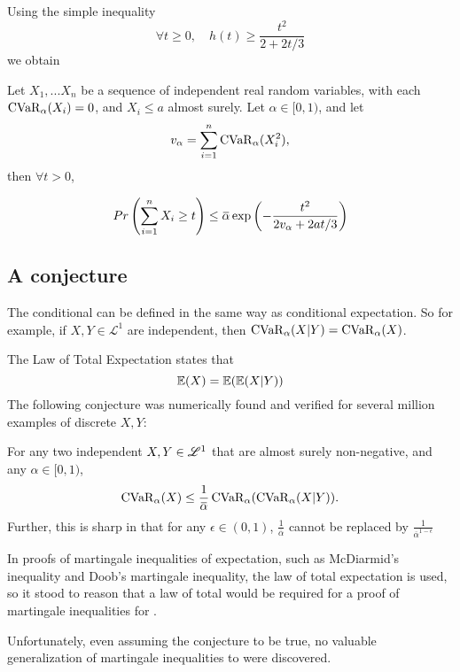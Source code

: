 Using the simple inequality
$$\forall t\ge 0, \quad h(t) \ge \frac{t^2}{2 + 2t/3} $$
we obtain
\begin{cor}
	Let $X_1, ... X_n$ be a sequence of independent real random variables, with each $\operatorname{CVaR}_\alpha(X_i)  = 0$, and $X_i \le a$ almost surely. Let $\alpha \in [0, 1)$, and let 
	$$v_\alpha = \sum_{i = 1}^n\operatorname{CVaR}_\alpha(X_i^2),$$
	then $\forall t > 0$, 
	
	\begin{equation}
	\begin{aligned}
	Pr\left(\sumn X_i \ge t\right) \le {\overbar{\alpha}} \exp\left(-\frac{t^2}{2v_\alpha + 2at/3}\right)
	\end{aligned}
	\end{equation}
\end{cor}

\subsection{A conjecture}
The conditional \cvar can be defined in the same way as conditional expectation. So for example, if $X, Y\in\mathscr{L}^1$ are independent, then $\operatorname{CVaR}_\alpha(X|Y) = \operatorname{CVaR}_\alpha(X)$.

The Law of Total Expectation states that 
\begin{equation}
\mathbb{E}(X) = \mathbb{E}(\mathbb{E}(X|Y))
\end{equation}
The following conjecture was numerically found and verified for several million examples of discrete $X, Y$:
\begin{conj}\label{conj:total_cvar}
	For any two independent $X, Y\in \mathscr{L}^1$ that are almost surely non-negative, and any $\alpha \in [0, 1)$, 
	\begin{equation}
	\Ca(X) \le \frac{1}{\overbar\alpha}\Ca(\Ca(X|Y)).
	\end{equation}
	Further, this is sharp in that for any $\epsilon\in(0, 1)$, $\frac{1}{\overbar\alpha}$ cannot be replaced by $\frac{1}{\overbar\alpha^{1-\epsilon}}$
\end{conj}

In proofs of martingale inequalities of expectation, such as McDiarmid's inequality and Doob's martingale inequality, the law of total expectation is used, so it stood to reason that a law of total \cvar would be required for a proof of martingale inequalities for \cvar. 

Unfortunately, even assuming the conjecture to be true, no valuable generalization of martingale inequalities to \cvar were discovered.

